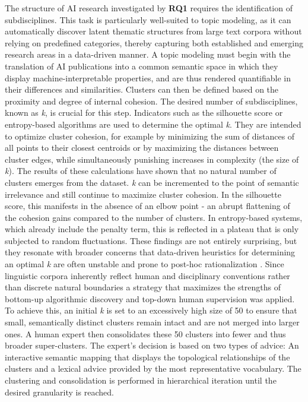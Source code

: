 \documentclass{article}
\begin{document}
	The structure of AI research investigated by \textbf{RQ1} requires the identification of subdisciplines. This task is particularly well-suited to topic modeling, as it can automatically discover latent thematic structures from large text corpora without relying on predefined categories, thereby capturing both established and emerging research areas in a data-driven manner. A topic modeling must begin with the translation of AI publications into a common semantic space in which they display machine-interpretable properties, and are thus rendered quantifiable in their differences and similarities. Clusters can then be defined based on the proximity and degree of internal cohesion. The desired number of subdisciplines, known as \textit{k}, is crucial for this step. Indicators such as the silhouette score or entropy-based algorithms are used to determine the optimal \textit{k}. They are intended to optimize cluster cohesion, for example by minimizing the sum of distances of all points to their closest centroids or by maximizing the distances between cluster edges, while simultaneously punishing increases in complexity (the size of \textit{k}). The results of these calculations have shown that no natural number of clusters emerges from the dataset. \textit{k} can be incremented to the point of semantic irrelevance and still continue to maximize cluster cohesion. In the silhouette score, this manifests in the absence of an elbow point - an abrupt flattening of the cohesion gains compared to the number of clusters. In entropy-based systems, which already include the penalty term, this is reflected in a plateau that is only subjected to random fluctuations. These findings are not entirely surprising,  but they resonate with broader concerns that data-driven heuristics for determining an optimal \textit{k} are often unstable and prone to post-hoc rationalization \cite{bulatov2024determination}. Since linguistic corpora inherently reflect human and disciplinary conventions rather than discrete natural boundaries a strategy that maximizes the strengths of bottom-up algorithmic discovery and top-down human supervision was applied. To achieve this, an initial \textit{k} is set to an excessively high size of 50 to ensure that small, semantically distinct clusters remain intact and are not merged into larger ones. A human expert then consolidates these 50 clusters into fewer and thus broader super-clusters. The expert's decision is based on two types of advice: An interactive semantic mapping that displays the topological relationships of the clusters and a lexical advice provided by the most representative vocabulary. The clustering and consolidation is performed in hierarchical iteration until the desired granularity is reached.
	
\end{document}
